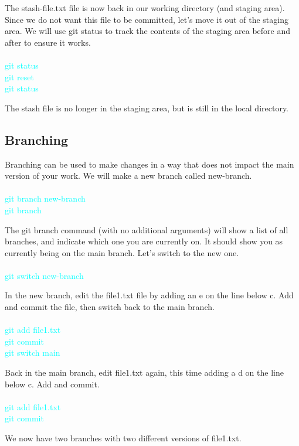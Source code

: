 \documentclass[10pt,twocolumn]{article}
\begin{document}
The stash-file.txt file is now back in our working directory (and staging area). Since we do not want this file to be committed, let’s move it out of the staging area. We will use git status to track the contents of the staging area before and after to ensure it works.\\\\
\textcolor{cyan}{
git status\\
git reset\\
git status\\
}

The stash file is no longer in the staging area, but is still in the local directory. 


\subsection{Branching}

Branching can be used to make changes in a way that does not impact the main version of your work. We will make a new branch called new-branch.\\\\
\textcolor{cyan}{
git branch new-branch\\
git branch\\
}

The git branch command (with no additional arguments) will show a list of all branches, and indicate which one you are currently on. It should show you as currently being on the main branch. Let’s switch to the new one. \\\\
\textcolor{cyan}{
git switch new-branch\\
}

In the new branch, edit the file1.txt file by adding an e on the line below c. Add and commit the file, then switch back to the main branch.\\\\
\textcolor{cyan}{
git add file1.txt\\
git commit\\
git switch main\\
}

Back in the main branch, edit file1.txt again, this time adding a d on the line below c. Add and commit.\\\\
\textcolor{cyan}{
git add file1.txt\\
git commit\\
}

We now have two branches with two different versions of file1.txt.
\end{document}
